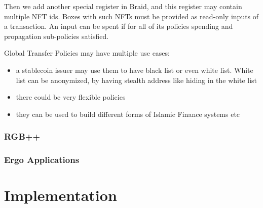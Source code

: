 \documentclass{llncs}   %
\newcommand{\authnote}[2]{\marginpar{\parbox{\marginparwidth}{\tiny %
  \textsf{#1 {\textcolor{blue}{notes: #2}}}}}%
  \textcolor{blue}{\textbf{\dag}}}
\newcommand{\authnote}[2]{
  \textsf{#1 \textcolor{blue}{: #2}}}
\newcommand{\authnote}[2]{}
\newcommand{\knote}[1]{{\authnote{\textcolor{green}{kushti notes}}{#1}}}
\begin{document}
Then we add another special register in Braid, and this register may contain multiple NFT ids. Boxes with such NFTs must be provided as read-only inputs of a transaction. An input can be spent if for all of its policies spending and propagation sub-policies satisfied.



Global Transfer Policies may have multiple use cases:

\begin{itemize}
\item a stablecoin issuer may use them to have black list or even white list. White list can be anonymized, by having stealth address like hiding in the white list
\item there could be very flexible policies  
\item they can be used to build different forms of Islamic Finance systems etc
\end{itemize}

\subsubsection{RGB++}

\subsubsection{Ergo Applications}

\knote{put a list}




\section{Implementation}
\label{sec-apps}



\newpage

 
\end{document}

